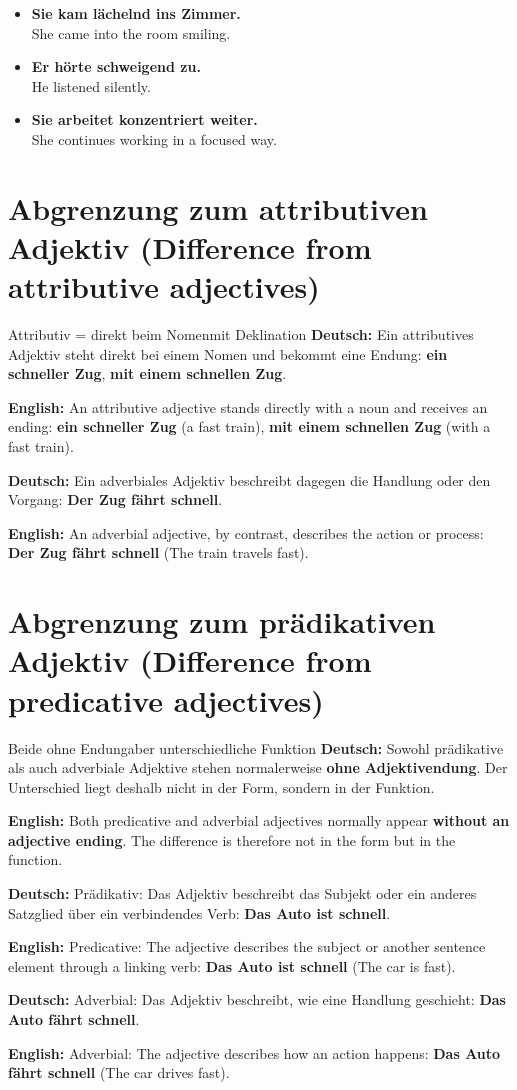 \documentclass[a4paper,11pt]{article}
\newcommand{\GermanText}[1]{\textbf{Deutsch: }#1\par}
\newcommand{\EnglishText}[1]{{\small\color{SoftGray}\textbf{English: }#1\par}}
\newcommand{\ExampleItem}[2]{\item \textbf{#1}\\{\small\color{SoftGray}#2}}
\begin{document}
        \begin{exbox}
            \begin{itemize}
                \ExampleItem{Sie kam lächelnd ins Zimmer.}{She came into the room smiling.}
                \ExampleItem{Er hörte schweigend zu.}{He listened silently.}
                \ExampleItem{Sie arbeitet konzentriert weiter.}{She continues working in a focused way.}
            \end{itemize}
        \end{exbox}

    \section{Abgrenzung zum attributiven Adjektiv \textnormal{(Difference from attributive adjectives)}}

        \begin{grammarentry}{Attributiv = direkt beim Nomen}{mit Deklination}
            \GermanText{Ein attributives Adjektiv steht direkt bei einem Nomen und bekommt eine Endung: \textbf{ein schneller Zug}, \textbf{mit einem schnellen Zug}.}
            \EnglishText{An attributive adjective stands directly with a noun and receives an ending: \textbf{ein schneller Zug} (a fast train), \textbf{mit einem schnellen Zug} (with a fast train).}

            \GermanText{Ein adverbiales Adjektiv beschreibt dagegen die Handlung oder den Vorgang: \textbf{Der Zug fährt schnell}.}
            \EnglishText{An adverbial adjective, by contrast, describes the action or process: \textbf{Der Zug fährt schnell} (The train travels fast).}
        \end{grammarentry}

    \section{Abgrenzung zum prädikativen Adjektiv \textnormal{(Difference from predicative adjectives)}}

        \begin{grammarentry}{Beide ohne Endung}{aber unterschiedliche Funktion}
            \GermanText{Sowohl prädikative als auch adverbiale Adjektive stehen normalerweise \textbf{ohne Adjektivendung}. Der Unterschied liegt deshalb nicht in der Form, sondern in der Funktion.}
            \EnglishText{Both predicative and adverbial adjectives normally appear \textbf{without an adjective ending}. The difference is therefore not in the form but in the function.}

            \GermanText{Prädikativ: Das Adjektiv beschreibt das Subjekt oder ein anderes Satzglied über ein verbindendes Verb: \textbf{Das Auto ist schnell}.}
            \EnglishText{Predicative: The adjective describes the subject or another sentence element through a linking verb: \textbf{Das Auto ist schnell} (The car is fast).}

            \GermanText{Adverbial: Das Adjektiv beschreibt, wie eine Handlung geschieht: \textbf{Das Auto fährt schnell}.}
            \EnglishText{Adverbial: The adjective describes how an action happens: \textbf{Das Auto fährt schnell} (The car drives fast).}
        \end{grammarentry}
\end{document}
